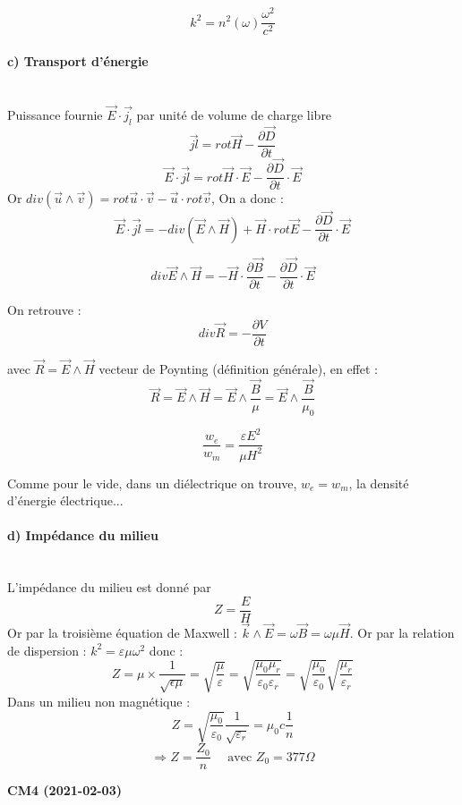 \documentclass[12pt,a4paper]{report}
\begin{document}
\[
	k^2 = n^2(\omega) \dfrac{\omega^2}{c^2}
\]

\paragraph{c) Transport d'énergie}\quad \\
Puissance fournie \(\vec{E} \cdot \vec{j_l}\) par unité de volume de charge libre
\[
	\vec{jl} = rot \vec{H} - \dfrac{\partial \vec{D}}{\partial t}
\]
\[
	\vec{E} \cdot \vec{jl} = rot \vec{H} \cdot \vec{E} - \dfrac{\partial \vec{D}}{\partial t} \cdot \vec{E}
\]
Or \(div (\vec{u} \wedge \vec{v}) = rot \vec{u} \cdot \vec{v} - \vec{u} \cdot rot \vec{v}\), On a donc :
\[
	\vec{E} \cdot \vec{jl} = - div (\vec{E} \wedge \vec{H}) + \vec{H} \cdot rot \vec{E} - \dfrac{\partial \vec{D}}{\partial t} \cdot \vec{E}
\]

\begin{equation}
	div \vec{E} \wedge \vec{H} = - \vec{H} \cdot \dfrac{\partial \vec{B}}{\partial t} - \dfrac{\partial \vec{D}}{\partial t} \cdot \vec{E}
\end{equation}

On retrouve :
\[
	div \vec{R} = - \dfrac{\partial V}{\partial t}
\]

avec \(\vec{R} = \vec{E} \wedge \vec{H}\) vecteur de Poynting (définition générale), en effet :
\[
	\vec{R} = \vec{E} \wedge \vec{H} = \vec{E} \wedge \dfrac{\vec{B}}{\mu} = \vec{E} \wedge \dfrac{\vec{B}}{\mu_0}
\]

\begin{equation}
	\dfrac{w_e}{w_m} = \dfrac{\varepsilon E^2}{\mu H^2}
\end{equation}

Comme pour le vide, dans un diélectrique on trouve, \(w_e = w_m\), la densité d'énergie électrique...

\paragraph{d) Impédance du milieu} \quad	\\
L'impédance du milieu est donné par 
\[
	Z = \dfrac{E}{H}
\]
Or par la troisième équation de Maxwell : \(\vec{k} \wedge \vec{E} = \omega \vec{B} = \omega \mu \vec{H}\).
Or par la relation de dispersion : \(k^2 = \varepsilon\mu\omega^2\) donc :
\[
	Z = \mu \times \dfrac{1}{\sqrt{\epsilon\mu}} = \sqrt{\dfrac{\mu}{\varepsilon}} = \sqrt{\dfrac{\mu_0 \mu_r}{\varepsilon_0 \varepsilon_r}} = \sqrt{\dfrac{\mu_0}{\varepsilon_0}} \sqrt{\dfrac{\mu_r}{\varepsilon_r}}
\]
Dans un milieu non magnétique :
\[
	Z = \sqrt{\dfrac{\mu_0}{\varepsilon_0}} \dfrac{1}{\sqrt{\varepsilon_r}} = \mu_0 c \dfrac{1}{n}
\]
\[
	\Rightarrow Z = \dfrac{Z_0}{n} \quad	 \text{ avec } Z_0 = 377 \Omega
\]
\begin{center}
\textbf{CM4 (2021-02-03)}
\end{center}
\end{document}
